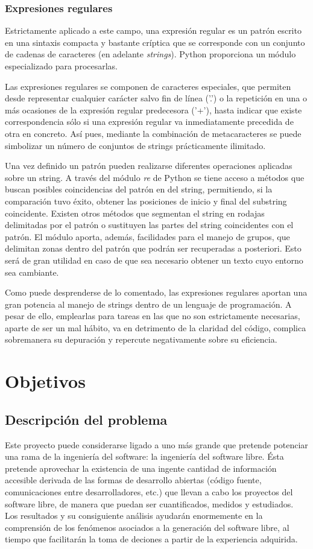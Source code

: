 \subsection{Expresiones regulares} \label{regex}
Estrictamente aplicado a este campo, una expresión regular es un patrón
escrito en una sintaxis compacta y bastante críptica que se corresponde con
un conjunto de cadenas de caracteres (en adelante \textit{strings}).
Python proporciona un módulo especializado para procesarlas.

Las expresiones regulares se componen de caracteres especiales, que permiten
desde representar cualquier carácter salvo fin de línea ('.') o la repetición
en una
o más ocasiones de la expresión regular predecesora ('+'), hasta indicar
que existe
correspondencia sólo si una expresión regular va inmediatamente precedida de
otra en concreto. Así pues, mediante la combinación de metacaracteres se
puede simbolizar un número de conjuntos de strings prácticamente ilimitado.

Una vez definido un patrón pueden realizarse diferentes operaciones aplicadas
sobre un string. A través del módulo \textit{re} de Python se tiene acceso a
métodos que buscan posibles coincidencias del patrón en del string, permitiendo,
si la comparación tuvo éxito, obtener las posiciones de inicio y final del
substring coincidente. Existen otros métodos que segmentan el string en rodajas
delimitadas por el patrón o sustituyen las partes del string coincidentes
con el patrón.
El módulo aporta, además, facilidades para el manejo de grupos, que delimitan
zonas dentro del patrón que podrán ser recuperadas a posteriori. Esto será
de gran utilidad en caso de que sea necesario obtener un texto cuyo entorno
sea cambiante.

Como puede desprenderse de lo comentado, las expresiones regulares aportan
una gran potencia al manejo de strings dentro de un lenguaje de programación.
A pesar de ello, emplearlas para tareas en las que no son estrictamente
necesarias, aparte de ser un mal hábito, va en detrimento de la claridad del
código, complica sobremanera su depuración y repercute negativamente sobre su
eficiencia.




\newpage
\chapter{Objetivos}
\section{Descripción del problema}
Este proyecto puede considerarse ligado a uno más grande que pretende potenciar
una rama de la ingeniería del software: la ingeniería del software libre.
Ésta pretende aprovechar la existencia de una ingente cantidad de información
accesible derivada de las formas de desarrollo abiertas (código fuente,
comunicaciones entre desarrolladores, etc.) que llevan
a cabo los proyectos del software libre, de manera que puedan ser cuantificados,
medidos y estudiados. Los resultados y su consiguiente análisis ayudarán
enormemente en la comprensión de los fenómenos asociados a la
generación del software libre, al tiempo que facilitarán la toma de deciones
a partir de la experiencia adquirida.

